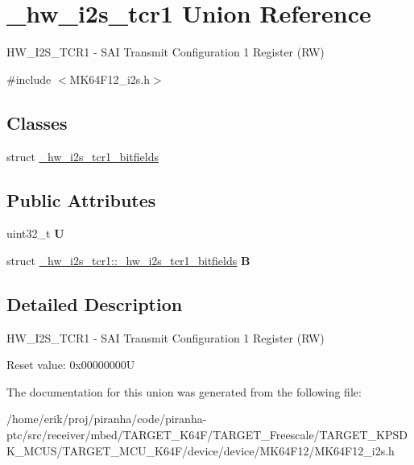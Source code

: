 \hypertarget{union__hw__i2s__tcr1}{}\section{\+\_\+hw\+\_\+i2s\+\_\+tcr1 Union Reference}
\label{union__hw__i2s__tcr1}


H\+W\+\_\+\+I2\+S\+\_\+\+T\+C\+R1 -\/ S\+AI Transmit Configuration 1 Register (RW)  




{\ttfamily \#include $<$M\+K64\+F12\+\_\+i2s.\+h$>$}

\subsection*{Classes}
\begin{DoxyCompactItemize}
\item 
struct \hyperlink{struct__hw__i2s__tcr1_1_1__hw__i2s__tcr1__bitfields}{\+\_\+hw\+\_\+i2s\+\_\+tcr1\+\_\+bitfields}
\end{DoxyCompactItemize}
\subsection*{Public Attributes}
\begin{DoxyCompactItemize}
\item 
uint32\+\_\+t {\bfseries U}\hypertarget{union__hw__i2s__tcr1_aec838c4513caadbd4168dfb3807739e3}{}\label{union__hw__i2s__tcr1_aec838c4513caadbd4168dfb3807739e3}

\item 
struct \hyperlink{struct__hw__i2s__tcr1_1_1__hw__i2s__tcr1__bitfields}{\+\_\+hw\+\_\+i2s\+\_\+tcr1\+::\+\_\+hw\+\_\+i2s\+\_\+tcr1\+\_\+bitfields} {\bfseries B}\hypertarget{union__hw__i2s__tcr1_a133888b7eb501c3a40c92c9a059fa435}{}\label{union__hw__i2s__tcr1_a133888b7eb501c3a40c92c9a059fa435}

\end{DoxyCompactItemize}


\subsection{Detailed Description}
H\+W\+\_\+\+I2\+S\+\_\+\+T\+C\+R1 -\/ S\+AI Transmit Configuration 1 Register (RW) 

Reset value\+: 0x00000000U 

The documentation for this union was generated from the following file\+:\begin{DoxyCompactItemize}
\item 
/home/erik/proj/piranha/code/piranha-\/ptc/src/receiver/mbed/\+T\+A\+R\+G\+E\+T\+\_\+\+K64\+F/\+T\+A\+R\+G\+E\+T\+\_\+\+Freescale/\+T\+A\+R\+G\+E\+T\+\_\+\+K\+P\+S\+D\+K\+\_\+\+M\+C\+U\+S/\+T\+A\+R\+G\+E\+T\+\_\+\+M\+C\+U\+\_\+\+K64\+F/device/device/\+M\+K64\+F12/M\+K64\+F12\+\_\+i2s.\+h\end{DoxyCompactItemize}
